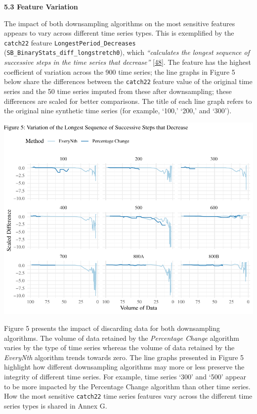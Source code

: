 \documentclass{article}
\begin{document}
\textbf{5.3 Feature Variation}

The impact of both downsampling algorithms on the most sensitive
features appears to vary across different time series types. This is
exemplified by the \texttt{catch22} feature
\texttt{LongestPeriod\_Decreases}
(\texttt{SB\_BinaryStats\_diff\_longstretch0}), which \emph{``calculates
the longest sequence of successive steps in the time series that
decrease''} \protect\hyperlink{ref-feature_book}{{[}48{]}}. The feature
has the highest coefficient of variation across the 900 time series; the
line graphs in Figure 5 below share the differences between the
\texttt{catch22} feature value of the original time series and the 50
time series imputed from these after downsampling; these differences are
scaled for better comparisons. The title of each line graph refers to
the original nine synthetic time series (for example, `100,' `200,' and
`300').

\includegraphics{210431461_CSC8639_Dissertation_files/figure-latex/LongestDecreases-1.pdf}

Figure 5 presents the impact of discarding data for both downsampling
algorithms. The volume of data retained by the \emph{Percentage Change}
algorithm varies by the type of time series whereas the volume of data
retained by the \emph{EveryNth} algorithm trends towards zero. The line
graphs presented in Figure 5 highlight how different downsampling
algorithms may more or less preserve the integrity of different time
series. For example, time series `300' and `500' appear to be more
impacted by the Percentage Change algorithm than other time series. How
the most sensitive \texttt{catch22} time series features vary across the
different time series types is shared in Annex G.
\end{document}
